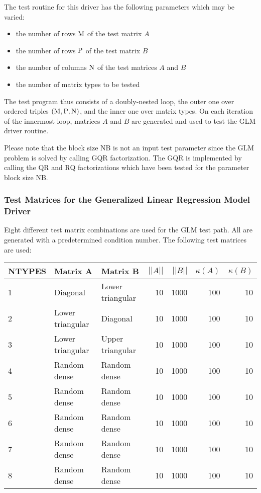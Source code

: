 The test routine for this driver has the following parameters which
may be varied:
\begin{itemize}
\item   the number of rows ${\rm M}$ of the test matrix $A$
\item   the number of rows ${\rm P}$ of the test matrix $B$
\item   the number of columns ${\rm N}$ of the test matrices $A$ and $B$
\item   the number of matrix types to be tested
\end{itemize}
The test program thus consists of a doubly-nested
loop, the outer one over ordered triples $({\rm M},{\rm P}, {\rm N})$,
and the inner one over matrix types.
On each iteration of the innermost loop,
matrices $A$ and $B$ are generated and used
to test the GLM driver routine.

Please note that the block size NB is not an input
test parameter since the GLM problem is solved by calling GQR factorization.
The GQR is implemented by calling the QR and RQ factorizations 
which have been tested for the parameter block size NB.

\subsubsection{Test Matrices for the Generalized Linear Regression Model Driver}
\dent
Eight different test matrix combinations are used for the GLM test path.  All
are generated with a predetermined condition number.
The following test matrices are used:
\TS
\begin{tabular}{|l|l|l|r|r|r|r|} \hline
NTYPES & Matrix A & Matrix B & $||A||$ & $||B||$ & $\kappa(A)$ &
$\kappa(B)$ \\
\hline
1      & Diagonal & Lower triangular & 10 & 1000 & 100 & 10 \\
2      & Lower triangular & Diagonal & 10 & 1000 & 100 & 10 \\
3      & Lower triangular & Upper triangular & 10 & 1000 & 100 & 10 \\
4      & Random dense & Random dense & 10 & 1000 & 100 & 10 \\
5      & Random dense & Random dense & 10 & 1000 & 100 & 10 \\
6      & Random dense & Random dense & 10 & 1000 & 100 & 10 \\
7      & Random dense & Random dense & 10 & 1000 & 100 & 10 \\
8      & Random dense & Random dense & 10 & 1000 & 100 & 10 \\ \hline
\end{tabular}
\TE

